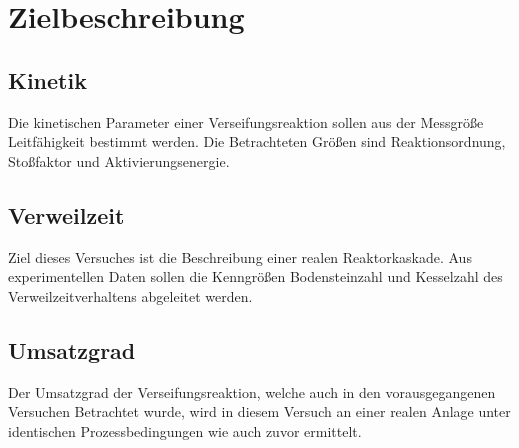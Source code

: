 \section{Zielbeschreibung}
\label{sec:zielbeschreibung}

\subsection{Kinetik}
Die kinetischen Parameter einer Verseifungsreaktion sollen aus der Messgröße Leitfähigkeit bestimmt werden.
Die Betrachteten Größen sind Reaktionsordnung, Stoßfaktor und Aktivierungsenergie.
\subsection{Verweilzeit}
Ziel dieses Versuches ist die Beschreibung einer realen Reaktorkaskade. Aus experimentellen Daten sollen die Kenngrößen Bodensteinzahl und Kesselzahl des Verweilzeitverhaltens abgeleitet werden.


\subsection{Umsatzgrad}
Der Umsatzgrad der Verseifungsreaktion, welche auch in den vorausgegangenen Versuchen Betrachtet wurde, wird in diesem Versuch an einer realen Anlage unter identischen Prozessbedingungen wie auch zuvor ermittelt.